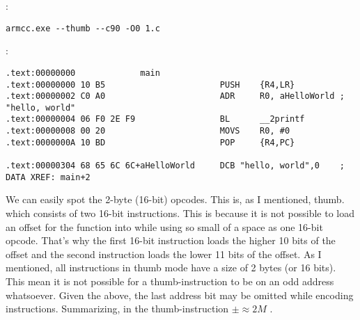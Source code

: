 :

\begin{lstlisting}
armcc.exe --thumb --c90 -O0 1.c 
\end{lstlisting}

:

\begin{lstlisting}[caption=\NonOptimizingKeil + \ThumbMode + \IDA]
.text:00000000             main
.text:00000000 10 B5                       PUSH    {R4,LR}
.text:00000002 C0 A0                       ADR     R0, aHelloWorld ; "hello, world"
.text:00000004 06 F0 2E F9                 BL      __2printf
.text:00000008 00 20                       MOVS    R0, #0
.text:0000000A 10 BD                       POP     {R4,PC}

.text:00000304 68 65 6C 6C+aHelloWorld     DCB "hello, world",0    ; DATA XREF: main+2
\end{lstlisting}

{We can easily spot the 2-byte (16-bit) opcodes. This is, as I mentioned, thumb}.
{which consists of two 16-bit instructions}.
{This is because it is not possible to load an offset for the \printf function into \PC while using so small of a space as one 16-bit opcode}.
{That's why the first 16-bit instruction loads the higher 10 bits of the offset and the second instruction loads 
the lower 11 bits of the offset}.
{As I mentioned, all instructions in thumb mode have a size of 2 bytes (or 16 bits)}.
{This mean it is not possible for a thumb-instruction to be on an odd address whatsoever}.
{Given the above, the last address bit may be omitted while encoding instructions}.
{Summarizing, in the  thumb-instruction} $\pm{}\approx{}2M$ 
.

